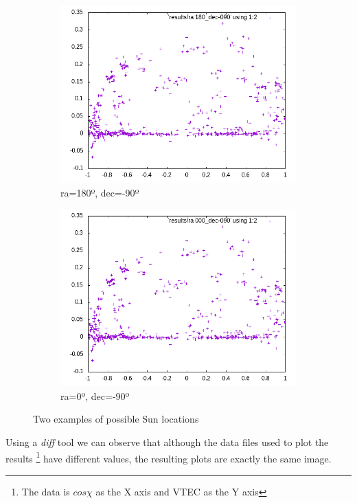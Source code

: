 \begin{figure}[!htb]
	\begin{subfigure}[b]{0.5\textwidth}
		\includegraphics[width=\linewidth]{images/ch4/ra180_dec-090.png}
		\caption{ra=180º, dec=-90º}
	\end{subfigure}
	\hfill
	\begin{subfigure}[b]{0.5\textwidth}
		\includegraphics[width=\linewidth]{images/ch4/ra000_dec-090.png}
		\caption{ra=0º, dec=-90º}
	\end{subfigure}
	\caption{Two examples of possible Sun locations}
	\label{fig:poles}
\end{figure}

Using a \textit{diff} tool we can observe that although the data files used to plot the results \footnote{The data is $cos\chi$ as the X axis and VTEC as the Y axis} have different values, the resulting plots are exactly the same image.


